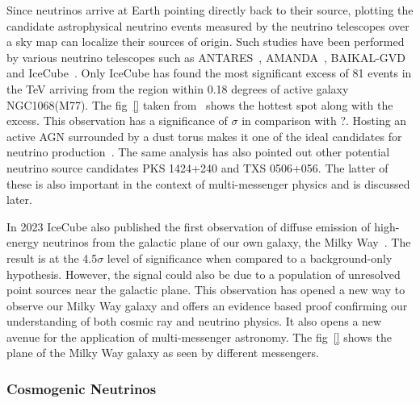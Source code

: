   Since neutrinos arrive at Earth pointing directly back to their source, plotting the candidate astrophysical neutrino events measured by the neutrino telescopes over a sky map can localize their sources of origin. Such studies have been performed by various neutrino telescopes such as ANTARES~\cite{Albert_2021}, AMANDA~\cite{Abbasi_2009_Amanda}, BAIKAL-GVD~\cite{Allakhverdyan_2023} and IceCube~\cite{Icecube_2022}. Only IceCube has found the most significant excess of 81 events in the TeV arriving from the region within 0.18 degrees of active galaxy NGC1068(M77). The fig~\ref{} taken from~\cite{Icecube_2022} shows the hottest spot along with the excess. This observation has a significance of $\sigma$ in comparison with ?. Hosting an active AGN surrounded by a dust torus makes it one of the ideal candidates for neutrino production~\cite{eichler1979high,berezinsky1981high}. The same analysis has also pointed out other potential neutrino source candidates PKS 1424+240 and TXS 0506+056. The latter of these is also important in the context of multi-messenger physics and is discussed later. 

  In 2023 IceCube also published the first observation of diffuse emission of high-energy neutrinos from the galactic plane of our own galaxy, the Milky Way~\cite{Galactic_plane_nu_2023}. The result is at the 4.5$\sigma$ level of significance when compared to a background-only hypothesis. However, the signal could also be due to a population of unresolved point sources near the galactic plane. This observation has opened a new way to observe our Milky Way galaxy and offers an evidence based proof confirming our understanding of both cosmic ray and neutrino physics. It also opens a new avenue for the application of multi-messenger astronomy. The fig~\ref{} shows the plane of the Milky Way galaxy as seen by different messengers.
  
\subsubsection*{Cosmogenic Neutrinos}

